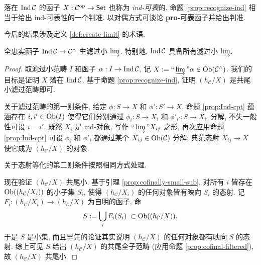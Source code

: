 落在 $\operatorname{Ind}\mathcal{C}$ 的函子 $X: \mathcal{C}^{\operatorname{op}} \to \mathsf{Set}$ 也称为 \emph{ind-可表}的. 命题 \ref{prop:recognize-ind} 相当于给出 ind-可表性的一个判准. 以对偶方式可谈论 \textbf{pro-可表}函子并给出判准.

今后的结果涉及定义 \ref{def:create-limit} 的术语.

\begin{proposition}\label{prop:Ind-filtered-colim}
	全忠实函子 $\operatorname{Ind}\mathcal{C} \to \mathcal{C}^\wedge$ 生滤过小 $\varinjlim$. 特别地, $\operatorname{Ind}\mathcal{C}$ 具备所有滤过小 $\varinjlim$.
\end{proposition}
\begin{proof}
	取滤过小范畴 $I$ 和函子 $\alpha: I \to \operatorname{Ind}\mathcal{C}$, 记 $X := \Yinjlim \alpha \in \Obj(\mathcal{C}^\wedge)$. 我们的目标是证明 $X$ 落在 $\operatorname{Ind}\mathcal{C}$. 基于命题 \ref{prop:recognize-ind}, 证明 $(h_{\mathcal{C}}/X)$ 是共尾小滤过范畴即可.
	
	关于滤过范畴的第一则条件, 给定 $\phi: S \to X$ 和 $\phi': S' \to X$, 命题 \ref{prop:Ind-cpt} 蕴涵存在 $i, i' \in \operatorname{Ob}(I)$ 使得它们分别通过 $\phi_i: S \to X_i$ 和 $\phi'_{i'}: S \to X_{i'}$ 分解, 不失一般性可设 $i = i'$. 既然 $X_i$ 是 ind-对象, 写作 $\Yinjlim X_{ij}$ 之形, 再次应用命题 \ref{prop:Ind-cpt} 可设 $\phi_i$ 和 $\phi'_i$ 都通过某个 $X_{ij} \in \operatorname{Ob}(\mathcal{C})$ 分解; 典范态射 $X_{ij} \to X$ 使它成为 $(h_{\mathcal{C}}/X)$ 的对象.
	
	关于态射等化的第二则条件按照相同方式处理.
	
	现在验证 $(h_{\mathcal{C}}/X)$ 共尾小. 基于引理 \ref{prop:cofinally-small-sub}, 对所有 $i$ 皆存在 $\operatorname{Ob}((h_{\mathcal{C}}/ X_i))$ 的小子集 $S_i$, 使得 $(h_{\mathcal{C}}/ X_i)$ 的任何对象皆有映向 $S_i$ 的态射. 记 $F_i: (h_{\mathcal{C}}/ X_i) \to (h_{\mathcal{C}}/ X)$ 为自明的函子, 命
	\[ S := \bigcup_i F_i(S_i) \;\subset \operatorname{Ob}((h_{\mathcal{C}}/ X)). \]
	于是 $S$ 是小集, 而且早先的论证其实说明 $(h_{\mathcal{C}}/ X)$ 的任何对象都有映向 $S$ 的态射. 综上可见 $S$ 给出 $(h_{\mathcal{C}}/ X)$ 的共尾全子范畴 (应用命题 \ref{prop:cofinal-filtered}), 故 $(h_{\mathcal{C}}/ X)$ 共尾小.
\end{proof}

